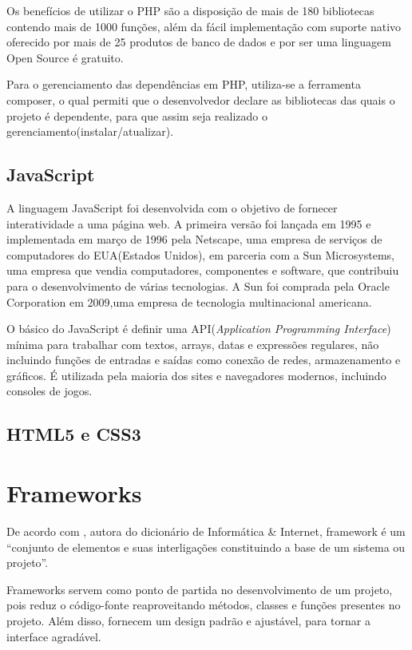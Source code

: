 Os benefícios de utilizar o PHP são a disposição de mais de 180 bibliotecas contendo mais de 1000 funções, além da fácil implementação com suporte nativo oferecido por mais de 25 produtos de banco de dados e por ser uma linguagem Open Source é gratuito.

Para o gerenciamento das dependências em PHP, utiliza-se a ferramenta composer, o qual permiti que o desenvolvedor declare as bibliotecas das quais o projeto é dependente, para que assim seja realizado o gerenciamento(instalar/atualizar). \cite{composer}


\subsection{JavaScript}

A linguagem JavaScript foi desenvolvida com o objetivo de fornecer interatividade a uma página web. A primeira versão foi lançada em 1995 e implementada em março de 1996 pela Netscape, uma empresa de serviços de computadores do EUA(Estados Unidos), em parceria com a Sun Microsystems, uma empresa que vendia computadores, componentes e software, que contribuiu para o desenvolvimento de várias tecnologias. A Sun foi comprada pela Oracle Corporation em 2009,uma empresa de tecnologia multinacional americana.

O básico do JavaScript é definir uma API(\textit{Application Programming Interface}) mínima para trabalhar com textos, arrays, datas e expressões regulares, não incluindo funções de entradas e saídas como conexão de redes, armazenamento e gráficos. É utilizada pela maioria dos sites e navegadores modernos, incluindo consoles de jogos.\cite{flanagan2004javascript}

\subsection{HTML5 e CSS3}



\section{Frameworks}

De acordo com , autora do dicionário de Informática \& Internet, framework é um “conjunto de elementos e suas interligações constituindo a base de um sistema ou projeto”.

Frameworks servem como ponto de partida no desenvolvimento de um projeto, pois reduz o código-fonte reaproveitando métodos, classes e funções presentes no projeto. Além disso, fornecem um design padrão e ajustável, para tornar a interface agradável.
 \cite {gabardo2017laravel}   

